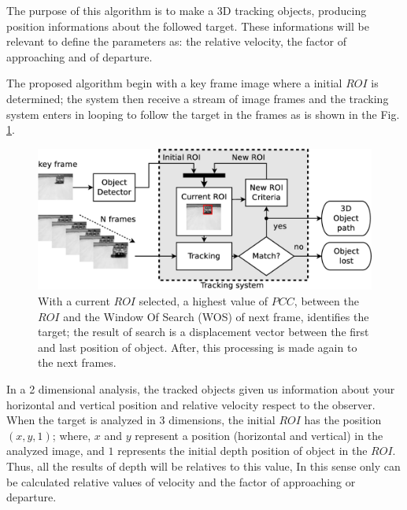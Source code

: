 The purpose of this algorithm is to make a 3D tracking objects, producing position informations 
about the followed target.
These informations will be relevant to define the parameters 
as: the relative velocity, the factor of approaching and of departure.

The proposed algorithm begin with a key frame image where a initial $ROI$ is determined; 
the system then receive a stream of image frames and the tracking system 
enters in looping to follow the target in the frames as is shown in the Fig. \ref{fig:system}.


\begin{figure}[bhp]
\includegraphics[width=\columnwidth]{images/figure1-diagram1.eps}
\caption{With a current $ROI$ selected, a highest value of $PCC$, between the $ROI$ 
and the Window Of Search (WOS) of next frame, identifies the target; 
the result of search is a displacement vector
between the first and last position of object. 
After, this processing is made again to the next frames.}
\label{fig:system}
\end{figure}

In a 2 dimensional analysis, the tracked objects given us information about your horizontal 
and vertical position and relative velocity respect to the observer.
When the target is analyzed in 3 dimensions, 
the initial $ROI$ has the position $(x,y,1)$;
where, $x$ and $y$ represent a position (horizontal and vertical) in the analyzed image,
and $1$ represents the initial depth position of object in the $ROI$.
Thus, all the results of depth will be relatives to this value, 
In this sense only can be calculated relative values of
velocity and the factor of approaching or departure. 

